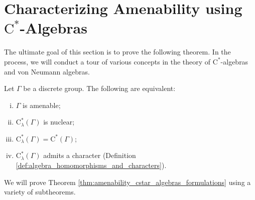 \section{Characterizing Amenability using \texorpdfstring{$\mathrm{C}^{\ast}$-Algebras}{C*-Algebras}}%
The ultimate goal of this section is to prove the following theorem. In the process, we will conduct a tour of various concepts in the theory of $\mathrm{C}^{\ast}$-algebras and von Neumann algebras.
\begin{theorem}\label{thm:amenability_cstar_algebras_formulations}
  Let $\Gamma$ be a discrete group. The following are equivalent:
  \begin{enumerate}[(i)]
    \item $\Gamma$ is amenable;
    \item $\mathrm{C}^{\ast}_{\lambda}\left( \Gamma \right)$ is nuclear;
    \item $\mathrm{C}^{\ast}_{\lambda}\left( \Gamma \right) = \mathrm{C}^{\ast}\left( \Gamma \right)$;
    \item $\mathrm{C}^{\ast}_{\lambda}\left( \Gamma \right)$ admits a character (Definition \ref{def:algebra_homomorphisms_and_characters}).
  \end{enumerate}
\end{theorem}
We will prove Theorem \ref{thm:amenability_cstar_algebras_formulations} using a variety of subtheorems.
